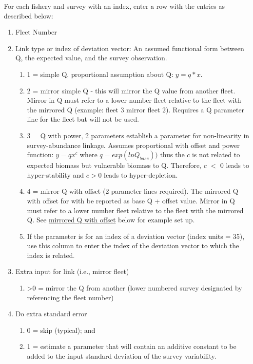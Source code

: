 For each fishery and survey with an index, enter a row with the entries as described below:

\begin{enumerate}
	\item Fleet Number
	\item Link type or index of deviation vector: An assumed functional form between Q, the expected value, and the survey observation.
	\begin{enumerate}
		\item 1 = simple Q, proportional assumption about Q: $y=q*x$.
		\item 2 = mirror simple Q - this will mirror the Q value from another fleet. Mirror in Q must refer to a lower number fleet relative to the fleet with the mirrored Q (example: fleet 3 mirror fleet 2). Requires a Q parameter line for the fleet but will not be used.
		\item 3 = Q with power, 2 parameters establish a parameter for non-linearity in survey-abundance linkage.  Assumes proportional with offset and power function: $y=qx^c$ where $q = exp(lnQ_{base}))$ thus the $c$ is not related to expected biomass but vulnerable biomass to Q.  Therefore, $c$ $<$ 0 leads to hyper-stability and $c > 0$ leads to hyper-depletion.
		\item 4 = mirror Q with offset (2 parameter lines required). The mirrored Q with offset for with be reported as base Q + offset value. Mirror in Q must refer to a lower number fleet relative to the fleet with the mirrored Q. See \hyperlink{MirrorQoffset}{mirrored Q with offset} below for example set up.
		\item If the parameter is for an index of a deviation vector (index units = 35), use this column to enter the index of the deviation vector to which the index is related.
	\end{enumerate}
	\item Extra input for link (i.e., mirror fleet)
	\begin{enumerate}
		\item >0 = mirror the Q from another (lower numbered survey designated by referencing the fleet number)
	\end{enumerate}
	\item Do extra standard error
	\begin{enumerate}
		\item 0 = skip (typical); and
		\item 1 = estimate a parameter that will contain an additive constant to be added to the input standard deviation of the survey variability.  

\end{enumerate}
\end{enumerate}
